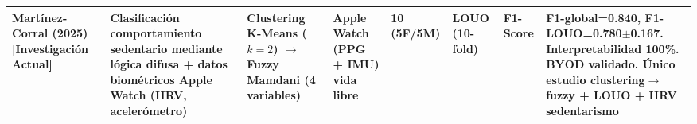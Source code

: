 \begin{table}[htbp]
\begin{tabular}{@{}p{1.8cm}p{2.2cm}p{1.5cm}p{1.3cm}p{0.8cm}p{1.2cm}p{1.8cm}p{1.5cm}@{}}
        \textbf{Martínez-Corral (2025)} \newline \textbf{[Investigación Actual]} & 
        \textbf{Clasificación comportamiento sedentario mediante lógica difusa + datos biométricos Apple Watch (HRV, acelerómetro)} & 
        \textbf{Clustering K-Means ($k=2$) $\rightarrow$ Fuzzy Mamdani (4 variables)} & 
        \textbf{Apple Watch (PPG + IMU) vida libre} & 
        \textbf{10 (5F/5M)} & 
        \textbf{LOUO (10-fold)} & 
        \textbf{F1-Score} & 
        \textbf{F1-global=0.840, F1-LOUO=0.780$\pm$0.167. Interpretabilidad 100\%. BYOD validado. Único estudio clustering$\rightarrow$fuzzy + LOUO + HRV sedentarismo} \\
        
        \bottomrule
    \end{tabular}
\end{table}

% 
% 
% 
% 
% 

